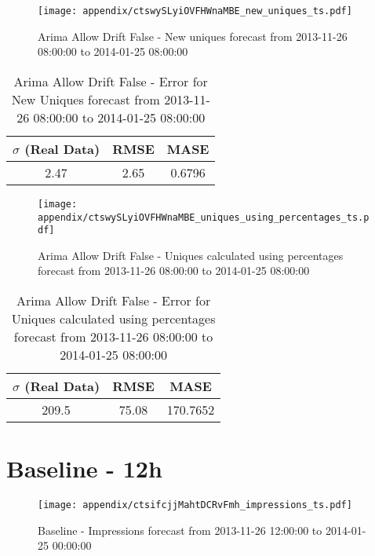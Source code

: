 \begin{figure}[H] \begin{center} \leavevmode
\texttt{[image: appendix/ctswySLyiOVFHWnaMBE\_new\_uniques\_ts.pdf]} \caption{
Arima Allow Drift False - New uniques forecast from 2013-11-26 08:00:00 to 2014-01-25 08:00:00} \label{fig:appendix/ctswySLyiOVFHWnaMBE_new_uniques_ts.pdf} \end{center}
\end{figure}

\begin{table}[H]
\centering
\footnotesize
\begin{tabular}{ccc}
$\sigma$ (Real Data) & RMSE & MASE   \\ \hline
2.47 & 2.65 & 0.6796 \\
\end{tabular}

\vspace{0.5cm}

\caption{
Arima Allow Drift False - Error for New Uniques forecast from 2013-11-26 08:00:00 to 2014-01-25 08:00:00}
\end{table}

\begin{figure}[H] \begin{center} \leavevmode
\texttt{[image: appendix/ctswySLyiOVFHWnaMBE\_uniques\_using\_percentages\_ts.pdf]} \caption{
Arima Allow Drift False - Uniques calculated using percentages forecast from 2013-11-26 08:00:00 to 2014-01-25 08:00:00} \label{fig:appendix/ctswySLyiOVFHWnaMBE_uniques_using_percentages_ts.pdf} \end{center}
\end{figure}

\begin{table}[H]
\centering
\footnotesize
\begin{tabular}{ccc}
$\sigma$ (Real Data) & RMSE & MASE   \\ \hline
209.5 & 75.08 & 170.7652 \\
\end{tabular}

\vspace{0.5cm}

\caption{
Arima Allow Drift False - Error for Uniques calculated using percentages forecast from 2013-11-26 08:00:00 to 2014-01-25 08:00:00}
\end{table}

\section{Baseline - 12h}
\begin{figure}[H] \begin{center} \leavevmode
\texttt{[image: appendix/ctsifcjjMahtDCRvFmh\_impressions\_ts.pdf]} \caption{
Baseline - Impressions forecast from 2013-11-26 12:00:00 to 2014-01-25 00:00:00} \label{fig:appendix/ctsifcjjMahtDCRvFmh_impressions_ts.pdf} \end{center}
\end{figure}

